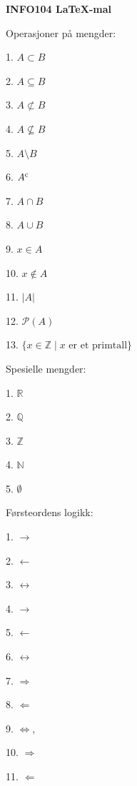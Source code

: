 \documentclass{article}
\begin{document}

{\Large \bf INFO104 \LaTeX\/-mal}


Operasjoner på mengder:

1. $A \subset B$ %

2. $A \subseteq B$

3. $A \not \subset B$ %

4. $A \not \subseteq B$

5. $A \setminus B$

6. $A^{\rm c}$ %

7. $A \cap B$

8. $A \cup B$

9. $x \in A$ 

10. $x \not \in A$ 

11. $|A|$ 

12. $\mathcal{P}(A)$ 

13. $\{x \in \mathbb{Z} \mid x \mbox{ er et primtall} \}$ %

Spesielle mengder:

1. $\mathbb{R}$ %

2. $\mathbb{Q}$ %

3. $\mathbb{Z}$ %

4. $\mathbb{N}$ %

5. $\emptyset$ %

Førsteordens logikk:


1. $\rightarrow$ 

2. $\leftarrow$

3. $\leftrightarrow$ 

4. $\longrightarrow$

5. $\longleftarrow$

6. $\longleftrightarrow$

7. $\Rightarrow$ %

8. $\Leftarrow$

9. $\Leftrightarrow$, %

10. $\Longrightarrow$

11. $\Longleftarrow$
\end{document}
